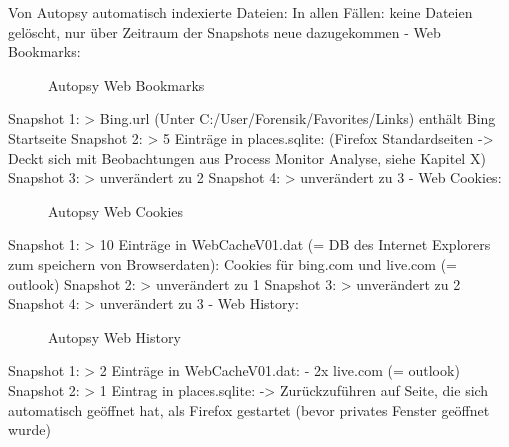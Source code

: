 Von Autopsy automatisch indexierte Dateien: 
In allen Fällen: keine Dateien gelöscht, nur über Zeitraum der Snapshots neue dazugekommen
- Web Bookmarks:
	\begin{figure}[h!]
		\centerline{}
		\label{chart:final-criteria}  
		\caption{Autopsy Web Bookmarks}
	\end{figure}
	Snapshot 1:
		> Bing.url (Unter C:/User/Forensik/Favorites/Links) enthält Bing Startseite
	Snapshot 2:
		> 5 Einträge in places.sqlite: (Firefox Standardseiten -> Deckt sich mit Beobachtungen aus Process Monitor Analyse, siehe Kapitel X)
	Snapshot 3:
		> unverändert zu 2
	Snapshot 4:
		> unverändert zu 3
- Web Cookies:
	\begin{figure}[h!]
		\centerline{}
		\label{chart:final-criteria}  
		\caption{Autopsy Web Cookies}
	\end{figure}
	Snapshot 1:
		> 10 Einträge in WebCacheV01.dat (= DB des Internet Explorers zum speichern von Browserdaten): Cookies für bing.com und live.com (= outlook)
	Snapshot 2:
		> unverändert zu 1
	Snapshot 3:
		> unverändert zu 2
	Snapshot 4:
		> unverändert zu 3
- Web History:
	\begin{figure}[h!]
		\centerline{}
		\label{chart:final-criteria}  
		\caption{Autopsy Web History}
	\end{figure}
	Snapshot 1:
		> 2 Einträge in WebCacheV01.dat:
			- 2x live.com (= outlook)
	Snapshot 2:
		> 1 Eintrag in places.sqlite: %
			-> Zurückzuführen auf Seite, die sich automatisch geöffnet hat, als Firefox gestartet (bevor privates Fenster geöffnet wurde)
